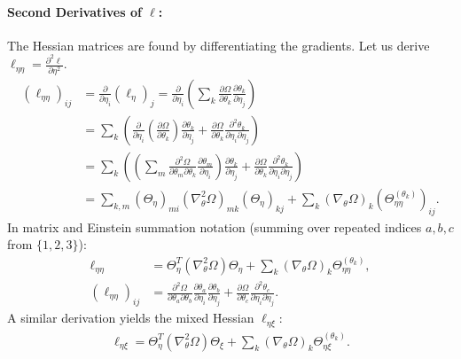 \documentclass{article}
\begin{document}
\paragraph{Second Derivatives of $\ell$:}

The Hessian matrices are found by differentiating the gradients.
Let us derive $\ell_{\eta\eta} = \frac{\partial^2 \ell}{\partial \eta^2}$.
%
\begin{align}
  (\ell_{\eta\eta})_{ij} & = \frac{\partial}{\partial \eta_i} (\ell_\eta)_j = \frac{\partial}{\partial \eta_i} \left( \sum_k \frac{\partial \Omega}{\partial \theta_k} \frac{\partial \theta_k}{\partial \eta_j} \right)                                                                                                           \\
                         & = \sum_k \left( \frac{\partial}{\partial \eta_i}\left(\frac{\partial \Omega}{\partial \theta_k}\right) \frac{\partial \theta_k}{\partial \eta_j} + \frac{\partial \Omega}{\partial \theta_k} \frac{\partial^2 \theta_k}{\partial \eta_i \partial \eta_j} \right)                                        \\
                         & = \sum_k \left( \left( \sum_m \frac{\partial^2 \Omega}{\partial \theta_m \partial \theta_k} \frac{\partial \theta_m}{\partial \eta_i} \right) \frac{\partial \theta_k}{\partial \eta_j} + \frac{\partial \Omega}{\partial \theta_k} \frac{\partial^2 \theta_k}{\partial \eta_i \partial \eta_j} \right) \\
                         & = \sum_{k,m} (\Theta_\eta)_{mi} (\nabla_\theta^2 \Omega)_{mk} (\Theta_\eta)_{kj} + \sum_k (\nabla_\theta \Omega)_k (\Theta_{\eta\eta}^{(\theta_k)})_{ij}.
\end{align}
%
In matrix and Einstein summation notation (summing over repeated indices $a, b, c$ from $\{1,2,3\}$):
%
\begin{align}
  \ell_{\eta \eta}       & = \Theta_{\eta}^{T} (\nabla_\theta^2 \Omega) \Theta_\eta + \sum_k (\nabla_\theta \Omega)_{k}   \Theta_{\eta\eta}^{(\theta_k)},                                                                                                                               \\
  (\ell_{\eta\eta})_{ij} & = \frac{\partial^2 \Omega}{\partial \theta_a \partial \theta_b} \frac{\partial \theta_a}{\partial \eta_i} \frac{\partial \theta_b}{\partial \eta_j} + \frac{\partial \Omega}{\partial \theta_c} \frac{\partial^2 \theta_c}{\partial \eta_i \partial \eta_j}.
\end{align}
%
A similar derivation yields the mixed Hessian $\ell_{\eta\xi}$:
%
\begin{align}
  \ell_{\eta \xi} = \Theta_{\eta}^{T} (\nabla_\theta^2 \Omega) \Theta_\xi + \sum_k (\nabla_\theta \Omega)_{k}   \Theta_{\eta\xi}^{(\theta_k)}.
\end{align}
\end{document}
